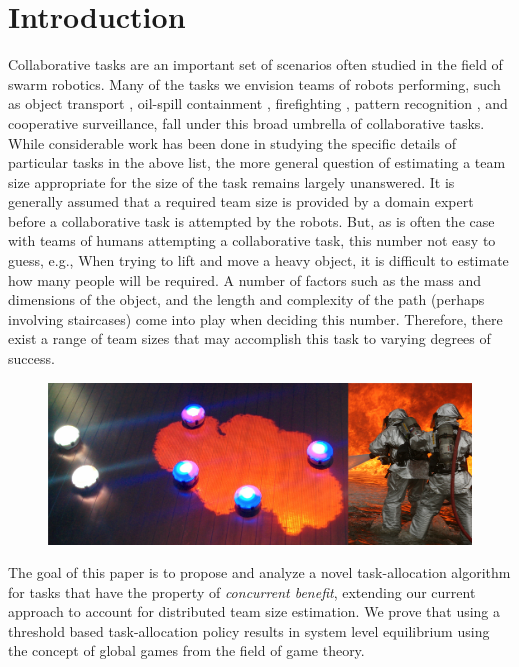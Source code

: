 \documentclass[conference]{ieeeconf}
\begin{document}
\section{Introduction}\label{sec:intro}
Collaborative tasks are an important set of scenarios often studied in the field of swarm robotics. Many of the tasks we envision teams of robots performing, such as object transport \cite{sugawara2012}, oil-spill containment \cite{beni2005swarm}, firefighting \cite{Krishnanand2006}, pattern recognition  \cite{beni1993swarm}, and cooperative surveillance, fall under this broad umbrella of collaborative tasks. While considerable work has been done in studying the specific details of particular tasks in the above list, the more general question of estimating a team size appropriate for the size of the task remains largely unanswered. It is generally assumed that a required team size is provided by a domain expert before a collaborative task is attempted by the robots. But, as is often the case with teams of humans attempting a collaborative task, this number not easy to guess, e.g., When trying to lift and move a heavy object, it is difficult to estimate how many people will be required. A number of factors such as the mass and dimensions of the object, and the length and complexity of the path (perhaps involving staircases) come into play when deciding this number. Therefore, there exist a range of team sizes that may accomplish this task to varying degrees of success.

\begin{figure}[!ht]
\centering\includegraphics[width=\textwidth]{../figures/dropletfire.png}
\centering\caption{}\label{fig:dropletfire}
\end{figure}

The goal of this paper is to propose and analyze a novel task-allocation algorithm for tasks that have the property of \emph{concurrent benefit}, extending our current approach to account for distributed team size estimation. We prove that using a threshold based task-allocation policy results in system level equilibrium using the concept of global games from the field of game theory. 
\end{document}

